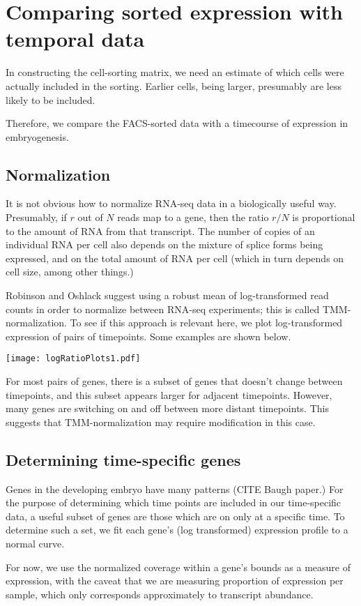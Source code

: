\documentclass{article}
\begin{document}
\section*{Comparing sorted expression with temporal data}

In constructing the cell-sorting matrix, we need an estimate of which cells
were actually included in the sorting. Earlier cells, being larger, presumably
are less likely to be included.

Therefore, we compare the FACS-sorted data with a timecourse of expression
in embryogenesis.

\subsection*{Normalization}

It is not obvious how to normalize RNA-seq data in a biologically useful way.
Presumably, if $r$ out of $N$ reads map to a gene, then the ratio $r/N$ is
proportional to the amount of RNA from that transcript. The number of copies
of an individual RNA per cell also depends on the mixture of splice forms
being expressed, and on the total amount of RNA per cell (which in turn
depends on cell size, among other things.)

Robinson and Oshlack suggest using a robust mean of log-transformed read counts
in order to normalize between RNA-seq experiments; this is called TMM-normalization.
To see if this approach is
relevant here, we plot log-transformed expression of pairs of timepoints.
Some examples are shown below.

\texttt{[image: logRatioPlots1.pdf]}

For most pairs of genes, there is a subset of genes that doesn't change between
timepoints, and this subset appears larger for adjacent timepoints. However,
many genes are switching on and off between more distant timepoints. This suggests
that TMM-normalization may require modification in this case.

\subsection*{Determining time-specific genes}

Genes in the developing embryo have many patterns (CITE Baugh paper.)
For the purpose of determining which time points are included in our time-specific
data, a useful subset of genes are those which are on only at a specific time.
To determine such a set, we fit each gene's (log transformed) expression
profile to a normal curve.

For now, we use the normalized coverage within a gene's bounds as a measure
of expression, with the caveat that we are measuring proportion of expression per
sample, which only corresponds approximately to transcript abundance.
\end{document}
